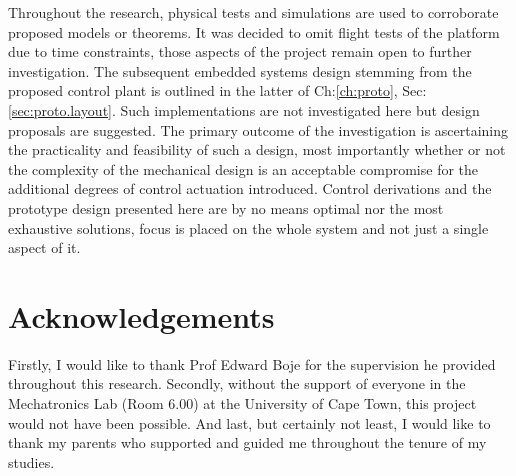 \documentclass[a4paper, 11pt, oneside, openright, parskip=full]{book}
\begin{document}
\par
Throughout the research, physical tests and simulations are used to corroborate proposed models or theorems. It was decided to omit flight tests of the platform due to time constraints, those aspects of the project remain open to further investigation. The subsequent embedded systems design stemming from the proposed control plant is outlined in the latter of Ch:\ref{ch:proto}, Sec:\ref{sec:proto.layout}. Such implementations are not investigated here but design proposals are suggested. The primary outcome of the investigation is ascertaining the practicality and feasibility of such a design, most importantly whether or not the complexity of the mechanical design is an acceptable compromise for the additional degrees of control actuation introduced. Control derivations and the prototype design presented here are by no means optimal nor the most exhaustive solutions, focus is placed on the whole system and not just a single aspect of it.
\par
\chapter{Acknowledgements}		
\label{ch:ack}
Firstly, I would like to thank Prof Edward Boje for the supervision he provided throughout this research. Secondly, without the support of everyone in the Mechatronics Lab (Room 6.00) at the University of Cape Town, this project would not have been possible. And last, but certainly not least, I would like to thank my parents who supported and guided me throughout the tenure of my studies. 
\end{document}

